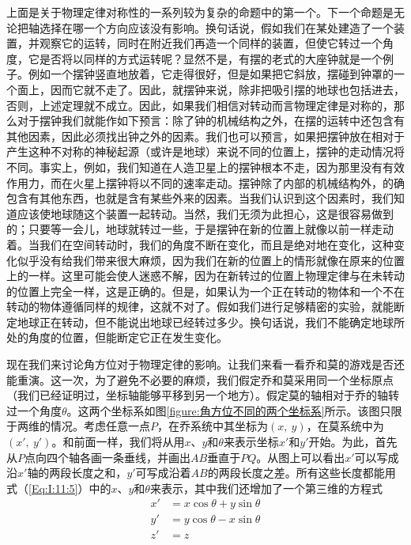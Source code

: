 上面是关于物理定律对称性的一系列较为复杂的命题中的第一个。下一个命题是无论把轴选择在哪一个方向应该没有影响。换句话说，假如我们在某处建造了一个装置，并观察它的运转，同时在附近我们再造一个同样的装置，但使它转过一个角度，它是否将以同样的方式运转呢？显然不是，有摆的老式的大座钟就是一个例子。例如一个摆钟竖直地放着，它走得很好，但是如果把它斜放，摆碰到钟罩的一个面上，因而它就不走了。因此，就摆钟来说，除非把吸引摆的地球也包括进去，否则，上述定理就不成立。因此，如果我们相信对转动而言物理定律是对称的，那么对于摆钟我们就能作如下预言：除了钟的机械结构之外，在摆的运转中还包含有其他因素，因此必须找出钟之外的因素。我们也可以预言，如果把摆钟放在相对于产生这种不对称的神秘起源（或许是地球）来说不同的位置上，摆钟的走动情况将不同。事实上，例如，我们知道在人造卫星上的摆钟根本不走，因为那里没有有效作用力，而在火星上摆钟将以不同的速率走动。摆钟除了内部的机械结构外，的确包含有其他东西，也就是含有某些外来的因素。当我们认识到这个因素时，我们知道应该使地球随这个装置一起转动。当然，我们无须为此担心，这是很容易做到的；只要等一会儿，地球就转过一些，于是摆钟在新的位置上就像以前一样走动着。当我们在空间转动时，我们的角度不断在变化，而且是绝对地在变化，这种变化似乎没有给我们带来很大麻烦，因为我们在新的位置上的情形就像在原来的位置上的一样。这里可能会使人迷惑不解，因为在新转过的位置上物理定律与在未转动的位置上完全一样，这是正确的。但是，如果认为一个正在转动的物体和一个不在转动的物体遵循同样的规律，这就不对了。假如我们进行足够精密的实验，就能断定地球正在转动，但不能说出地球已经转过多少。换句话说，我们不能确定地球所处的角度的位置，但能断定它正在发生变化。

现在我们来讨论角方位对于物理定律的影响。让我们来看一看乔和莫的游戏是否还能重演。这一次，为了避免不必要的麻烦，我们假定乔和莫采用同一个坐标原点（我们已经证明过，坐标轴能够平移到另一个地方）。假定莫的轴相对于乔的轴转过一个角度$\theta$。这两个坐标系如图\ref{figure:角方位不同的两个坐标系}所示。该图只限于两维的情况。考虑任意一点$P$，在乔系统中其坐标为$(x,~y)$，在莫系统中为$(x',~y')$。和前面一样，我们将从用$x$、$y$和$\theta$来表示坐标$x'$和$y'$开始。为此，首先从$P$点向四个轴各画一条垂线，并画出$AB$垂直于$PQ$。从图上可以看出$x'$可以写成沿$x'$轴的两段长度之和，$y'$可写成沿着$AB$的两段长度之差。所有这些长度都能用式（\ref{Eq:I:11:5}）中的$x$、$y$和$\theta$来表示，其中我们还增加了一个第三维的方程式
\begin{equation}
    \label{Eq:I:11:5}
    \begin{aligned}
        x'&=x \cos \theta + y \sin \theta \\
        y'&=y \cos \theta - x \sin \theta \\
        z'&=z
    \end{aligned}
\end{equation}

